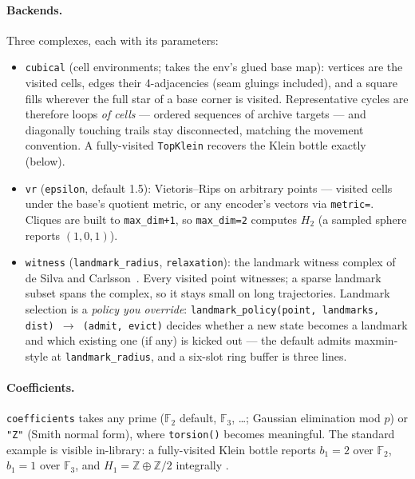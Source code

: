 \documentclass[11pt]{article}
\newcommand{\Hm}[1]{H_{#1}}
\newcommand{\F}{\mathbb{F}}
\newcommand{\Z}{\mathbb{Z}}
\begin{document}
\paragraph{Backends.} Three complexes, each with its parameters:
\begin{itemize}[leftmargin=2em, itemsep=1pt]
  \item \texttt{cubical} (cell environments; takes the env's glued
        base map): vertices are the visited cells, edges their
        4-adjacencies (seam gluings included), and a square fills
        wherever the full star of a base corner is visited.
        Representative cycles are therefore loops \emph{of cells} ---
        ordered sequences of archive targets --- and diagonally
        touching trails stay disconnected, matching the movement
        convention. A fully-visited \texttt{TopKlein} recovers the
        Klein bottle exactly (below).
  \item \texttt{vr} (\texttt{epsilon}, default 1.5): Vietoris--Rips
        on arbitrary points --- visited cells under the base's
        quotient metric, or any encoder's vectors via
        \texttt{metric=}. Cliques are built to \texttt{max\_dim+1},
        so \texttt{max\_dim=2} computes $\Hm{2}$ (a sampled sphere
        reports $(1, 0, 1)$).
  \item \texttt{witness} (\texttt{landmark\_radius},
        \texttt{relaxation}): the landmark witness complex of de
        Silva and Carlsson~\cite{deSilvaCarlsson04}. Every visited
        point witnesses; a sparse landmark subset spans the complex,
        so it stays small on long trajectories. Landmark selection is
        a \emph{policy you override}:
        \texttt{landmark\_policy(point, landmarks, dist)
        $\to$ (admit, evict)} decides whether a new state becomes a
        landmark and which existing one (if any) is kicked out ---
        the default admits maxmin-style at
        \texttt{landmark\_radius}, and a six-slot ring buffer is
        three lines.
\end{itemize}

\paragraph{Coefficients.} \texttt{coefficients} takes any prime
($\F_2$ default, $\F_3$, \dots; Gaussian elimination mod $p$) or
\texttt{"Z"} (Smith normal form), where \texttt{torsion()} becomes
meaningful. The standard example is visible in-library: a
fully-visited Klein bottle reports $b_1 = 2$ over $\F_2$, $b_1 = 1$
over $\F_3$, and $H_1 = \Z \oplus \Z/2$ integrally
\cite{carlsson09}.
\end{document}
